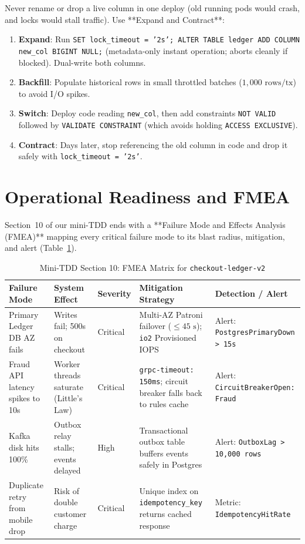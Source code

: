 \begin{productionwarningbox}
Never rename or drop a live column in one deploy (old running pods would crash, and locks would stall traffic). Use **Expand and Contract**:
\begin{enumerate}[leftmargin=14pt]
  \item \textbf{Expand}: Run \texttt{SET lock\_timeout = '2s'; ALTER TABLE ledger ADD COLUMN new\_col BIGINT NULL;} (metadata-only instant operation; aborts cleanly if blocked). Dual-write both columns.
  \item \textbf{Backfill}: Populate historical rows in small throttled batches ($1,000\text{ rows/tx}$) to avoid I/O spikes.
  \item \textbf{Switch}: Deploy code reading \texttt{new\_col}, then add constraints \texttt{NOT VALID} followed by \texttt{VALIDATE CONSTRAINT} (which avoids holding \texttt{ACCESS EXCLUSIVE}).
  \item \textbf{Contract}: Days later, stop referencing the old column in code and drop it safely with \texttt{lock\_timeout = '2s'}.
\end{enumerate}
\end{productionwarningbox}

\section{Operational Readiness and FMEA}

Section~10 of our mini-TDD ends with a **Failure Mode and Effects Analysis (FMEA)** mapping every critical failure mode to its blast radius, mitigation, and alert (Table~\ref{tab:v5-ch07-fmea}).

\begin{table}[htbp]
\centering\scriptsize
\begin{tabular}{p{2.7cm}p{2.7cm}p{1.2cm}p{3.2cm}p{2.8cm}}
\toprule
\textbf{Failure Mode} & \textbf{System Effect} & \textbf{Severity} & \textbf{Mitigation Strategy} & \textbf{Detection / Alert} \\
\midrule
Primary Ledger DB AZ fails & Writes fail; 500s on checkout & Critical & Multi-AZ Patroni failover ($\le 45\text{ s}$); \texttt{io2} Provisioned IOPS & Alert: \texttt{PostgresPrimaryDown > 15s} \\
Fraud API latency spikes to 10s & Worker threads saturate (Little's Law) & Critical & \texttt{grpc-timeout: 150ms}; circuit breaker falls back to rules cache & Alert: \texttt{CircuitBreakerOpen: Fraud} \\
Kafka disk hits 100\% & Outbox relay stalls; events delayed & High & Transactional outbox table buffers events safely in Postgres & Alert: \texttt{OutboxLag > 10,000 rows} \\
Duplicate retry from mobile drop & Risk of double customer charge & Critical & Unique index on \texttt{idempotency\_key} returns cached response & Metric: \texttt{IdempotencyHitRate} \\
\bottomrule
\end{tabular}
\caption{Mini-TDD Section 10: FMEA Matrix for \texttt{checkout-ledger-v2}}
\label{tab:v5-ch07-fmea}
\end{table}

